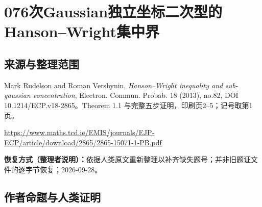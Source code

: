 \documentclass[UTF8,11pt]{ctexart}
\theoremstyle{definition}
\begin{document}
\section*{076\quad 次Gaussian独立坐标二次型的Hanson--Wright集中界}
\subsection*{来源与整理范围}
Mark Rudelson and Roman Vershynin, \emph{Hanson--Wright inequality and sub-gaussian concentration}, Electron. Commun. Probab. 18 (2013), no.82, DOI 10.1214/ECP.v18-2865。Theorem 1.1 与完整五步证明，印刷页2--5；记号取第1页。
\par\url{https://www.maths.tcd.ie/EMIS/journals/EJP-ECP/article/download/2865/2865-15071-1-PB.pdf}
\par\textbf{恢复方式（整理者说明）：}依据人类原文重新整理以补齐缺失题号；并非旧题证文件的逐字节恢复；2026-09-28。
\subsection*{作者命题与人类证明}
\end{document}
